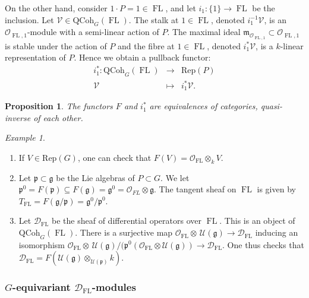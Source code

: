 \documentclass[10pt, oneside]{amsart}
\numberwithin{equation}{subsection}
\newtheorem{proposition}[equation]{Proposition}
\theoremstyle{definition}
\theoremstyle{remark}
\newtheorem{example}[equation]{Example}
\newcommand{\opn}[1]{\operatorname{#1}}
\begin{document}
On the other hand, consider $1 \cdot P=1 \in \opn{FL}$, and let $i_1 : \{1\} \rightarrow \opn{FL}$ be the inclusion. Let $\mathcal{V} \in \mathrm{QCoh}_{G}(\opn{FL})$. The stalk at $1 \in \opn{FL}$, denoted $i_1^{-1}\mathcal{V}$, is an $\mathcal{O}_{\opn{FL},1}$-module with a  semi-linear action of $P$. The maximal ideal $\mathfrak{m}_{\mathcal{O}_{\opn{FL},1}} \subset \mathcal{O}_{\opn{FL},1}$ is stable under the action of $P$ and the fibre at $1 \in \opn{FL}$, denoted $i_1^* \mathcal{V}$, is a $k$-linear representation of $P$. Hence we obtain a pullback functor: 
\begin{eqnarray*}
i_1^* : \mathrm{QCoh}_{G}(\opn{FL}) & \rightarrow & \mathrm{Rep}(P)\\
\mathcal{V} & \mapsto & i_1^* \mathcal{V}.
\end{eqnarray*} 

\begin{proposition} 
The functors $F$ and $i_1^*$ are equivalences of categories, quasi-inverse of each other.
\end{proposition}

\begin{example} \leavevmode
\begin{enumerate}
\item If $V \in \mathrm{Rep}(G)$, one can check that $F(V) = \mathcal{O}_{\opn{FL}} \otimes_k V$.
\item Let $\mathfrak{p} \subset \mathfrak{g}$ be the Lie algebras of $P \subset G$. We let $\mathfrak{p}^0 = F(\mathfrak{p}) \subseteq F(\mathfrak{g}) = \mathfrak{g}^0 = \mathcal{O}_{FL} \otimes \mathfrak{g}$. The tangent sheaf on $\opn{FL}$ is given by $T_{\opn{FL}} = F(\mathfrak{g}/\mathfrak{p}) = \mathfrak{g}^0/\mathfrak{p}^0$. 
\item Let $\mathcal{D}_{\opn{FL}}$ be the sheaf of differential operators over $\opn{FL}$. This is an object of $\mathrm{QCoh}_{G}(\opn{FL})$. There is a surjective map $\mathcal{O}_{\opn{FL}} \otimes \, \mathcal{U}(\mathfrak{g}) \rightarrow \mathcal{D}_{\opn{FL}}$ inducing an isomorphism $\mathcal{O}_{\opn{FL}} \otimes \, \mathcal{U}(\mathfrak{g})/(\mathfrak{p}^0(\mathcal{O}_{\opn{FL}} \otimes \mathcal{U}(\mathfrak{g})) \rightarrow \mathcal{D}_{\opn{FL}}$.  One thus checks that $\mathcal{D}_{\opn{FL}} = F(\mathcal{U}(\mathfrak{g})\otimes_{\mathcal{U}(\mathfrak{p})} k)$. 
\end{enumerate}
\end{example}


\subsubsection{\texorpdfstring{$G$}{G}-equivariant \texorpdfstring{$\mathcal{D}_{\opn{FL}}$}{D}-modules}
\end{document}
